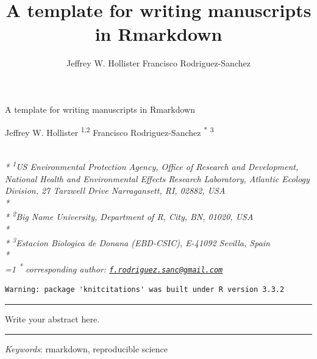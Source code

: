 \documentclass[11pt,a4paper]{article}
\title{A template for writing manuscripts in Rmarkdown}
\author{
Jeffrey W. Hollister
Francisco Rodriguez-Sanchez
}
\date{}
\begin{document}
\begin{singlespace}
\begin{center}
\huge A template for writing manuscripts in Rmarkdown
\end{center}
\begin{center}
\large
Jeffrey W. Hollister \textsuperscript{1,2} 
Francisco Rodriguez-Sanchez \textsuperscript{*} \textsuperscript{3} 
\end{center}
\begin{justify}
\footnotesize \emph{ 
\\*
\textsuperscript{1}US Environmental Protection Agency, Office of Research and Development,
National Health and Environmental Effects Research Laboratory, Atlantic
Ecology Division, 27 Tarzwell Drive Narragansett, RI, 02882, USA\\*
\\*
\textsuperscript{2}Big Name University, Department of R, City, BN, 01020, USA\\*
\\*
\textsuperscript{3}Estacion Biologica de Donana (EBD-CSIC), E-41092 Sevilla, Spain\\*
}
\setcounter{num}{1}
\\[0.1cm]
\footnotesize \emph{ 
\ifnum\value{num}=1%
\textsuperscript{*} corresponding author:
\fi
\href{mailto:f.rodriguez.sanc@gmail.com}{\nolinkurl{f.rodriguez.sanc@gmail.com}}
}
\end{justify}
\normalsize

\end{singlespace}


\begin{verbatim}
Warning: package 'knitcitations' was built under R version 3.3.2
\end{verbatim}

\singlespace

\vspace{2mm}

\hrule

Write your abstract here.

\vspace{3mm}

\hrule

\emph{Keywords}: rmarkdown, reproducible science

\doublespace
\end{document}
